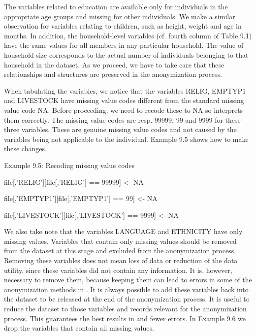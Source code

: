 \documentclass[letterpaper,10pt,english]{sphinxmanual}
\begin{document}
The variables related to education are available only for individuals in
the appropriate age groups and missing for other individuals. We make a
similar observation for variables relating to children, such as height,
weight and age in months. In addition, the household-level variables
(cf. fourth column of Table 9.1) have the same values for all members in
any particular household. The value of household size corresponds to the
actual number of individuals belonging to that household in the dataset.
As we proceed, we have to take care that these relationships and
structures are preserved in the anonymization process.

When tabulating the variables, we notice that the variables RELIG,
EMPTYP1 and LIVESTOCK have missing value codes different from the 
standard missing value code NA. Before proceeding, we need to recode
these to NA so  interprets them correctly. The missing value codes
are resp. 99999, 99 and 9999 for these three variables. These are
genuine missing value codes and not caused by the variables being not
applicable to the individual. Example 9.5 shows how to make these
changes. 

Example 9.5: Recoding missing value codes


file{[},’RELIG’{]}{[}file{[},’RELIG’{]} == 99999{]} \textless{}- NA

\begin{DUlineblock}{0em}
\item[] file{[},’EMPTYP1’{]}{[}file{[},’EMPTYP1’{]} == 99{]} \textless{}- NA
\item[] file{[},’LIVESTOCK’{]}{[}file{[},’LIVESTOCK’{]} == 9999{]} \textless{}- NA
\end{DUlineblock}

We also take note that the variables LANGUAGE and ETHNICITY have only
missing values. Variables that contain only missing values should be
removed from the dataset at this stage and excluded from the
anonymization process. Removing these variables does not mean loss of
data or reduction of the data utility, since these variables did not
contain any information. It is, however, necessary to remove them,
because keeping them can lead to errors in some of the anonymization
methods in . It is always possible to add these variables back into
the dataset to be released at the end of the anonymization process. It
is useful to reduce the dataset to those variables and records relevant
for the anonymization process. This guarantees the best results in 
and fewer errors. In Example 9.6 we drop the variables that contain all
missing values.
\end{document}
